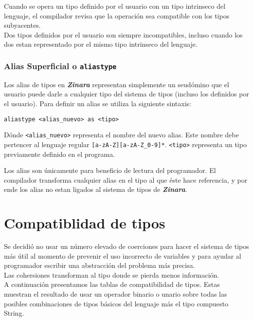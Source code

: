\documentclass[12pt, spanish]{report}
\begin{document}
Cuando se opera un tipo definido por el usuario con un tipo intrinseco
del lenguaje, el compilador revisa que la operaci\'on sea compatible
con los tipos subyacentes.\\
Dos tipos definidos por el usuario son siempre incompatibles, incluso
cuando los dos estan representado por el mismo tipo intrinseco del
lenguaje.\\

\subsection{Alias Superficial o \texttt{aliastype}}
Los alias de tipos en \emph{\textbf{Zinara}} representan simplemente
un seudómino que el usuario puede darle a cualquier tipo del sistema
de tipos (incluso los definidos por el usuario). Para definir un alias
se utiliza la siguiente sintaxis:

\begin{verbatim}
aliastype <alias_nuevo> as <tipo>
\end{verbatim}

Dónde \texttt{\textless alias\_nuevo\textgreater} representa el nombre
del nuevo alias. Este nombre debe pertencer al lenguaje regular
\texttt{[a-zA-Z][a-zA-Z\_0-9]*}. \texttt{\textless tipo\textgreater}
representa un tipo previamente definido en el programa.

Los alias son únicamente para beneficio de lectura del programador. El
compilador transforma cualquier alias en el tipo al que éste hace
referencia, y por ende los alias no estan ligados al sistema de tipos
de \emph{\textbf{Zinara}}.\\

\chapter{Compatiblidad de tipos}
\label{subsec:comp-tipos}
Se decidi\'o no usar un n\'umero elevado de coerciones para hacer el
sistema de tipos m\'as \'util al momento de prevenir el uso incorrecto
de variables y para ayudar al programador escribir una abstracci\'on del
problema m\'as precisa.\\

\indent Las cohersiones transforman al tipo donde se pierda menos informaci\'on.\\

\indent A continuaci\'on presentamos las tablas de compatibilidad de
tipos. Estas muestran el resultado de usar un operador binario o unario sobre
todas las posibles combinaciones de tipos b\'asicos del lenguaje m\'as
el tipo compuesto String.\\
\end{document}
